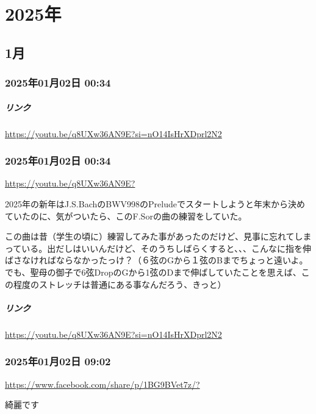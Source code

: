 \chapter{2025年}

\section{1月}

\subsection*{2025年01月02日 00:34}

\paragraph{リンク}
\url{https://youtu.be/q8UXw36AN9E?si=nO14IsHrXDprl2N2}

\subsection*{2025年01月02日 00:34}

\url{https://youtu.be/q8UXw36AN9E?}

2025年の新年はJ.S.BachのBWV998のPreludeでスタートしようと年末から決めていたのに、気がついたら、このF.Sorの曲の練習をしていた。

この曲は昔（学生の頃に）練習してみた事があったのだけど、見事に忘れてしまっている。出だしはいいんだけど、そのうちしばらくすると、、、こんなに指を伸ばさなければならなかったっけ？（６弦のGから１弦のBまでちょっと遠いよ。でも、聖母の御子で6弦DropのGから1弦のDまで伸ばしていたことを思えば、この程度のストレッチは普通にある事なんだろう、きっと）

\paragraph{リンク}
\url{https://youtu.be/q8UXw36AN9E?si=nO14IsHrXDprl2N2}

\subsection*{2025年01月02日 09:02}

\url{https://www.facebook.com/share/p/1BG9BVet7z/?}

綺麗です


